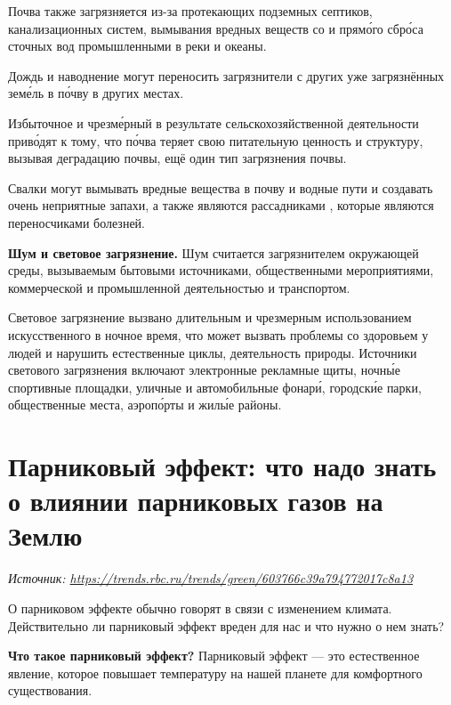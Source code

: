 Почва также загрязняется из-за протекающих подземных септиков, канализационных систем, вымывания вредных веществ со  и прям\'{о}го сбр\'{о}са сточных вод промышленными  в реки и океаны.

Дождь и наводнение могут переносить загрязнители с других уже загрязнённых зем\'{е}ль в п\'{о}чву в других местах.

Избыточное  и чрезм\'{е}рный  в результате сельскохозяйственной деятельности прив\'{о}дят к тому, что п\'{о}чва теряет свою питательную ценность и структуру, вызывая деградацию почвы, ещё один тип загрязнения почвы.

Свалки могут вымывать вредные вещества в почву и водные пути и создавать очень неприятные запахи, а также являются рассадниками , которые являются переносчиками болезней.

\textbf{Шум и световое загрязнение.}
Шум считается загрязнителем окружающей среды, вызываемым бытовыми источниками, общественными мероприятиями, коммерческой и промышленной деятельностью и транспортом.

Световое загрязнение вызвано длительным и чрезмерным использованием искусственного  в ночное время, что может вызвать проблемы со здоровьем у людей и нарушить естественные циклы,  деятельность  природы. Источники светового загрязнения включают электронные рекламные щиты, ночн\'{ы}е спортивные площадки, уличные и автомобильные фонар\'{и}, городск\'{и}е парки, общественные места, аэроп\'{о}рты и жил\'{ы}е районы.


\section[Парниковый эффект]{Парниковый эффект: что надо знать о влиянии парниковых газов на Землю}

\textit{Источник: \url{https://trends.rbc.ru/trends/green/603766c39a794772017c8a13}}

О парниковом эффекте обычно говорят в связи с изменением климата. Действительно ли парниковый эффект вреден для нас и что нужно о нем знать?

\textbf{Что такое парниковый эффект?}
Парниковый эффект — это естественное явление, которое повышает температуру на нашей планете для комфортного существования.

